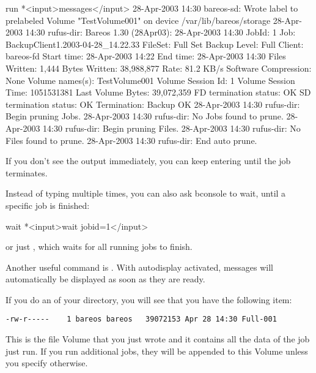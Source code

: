 
\begin{bconsole}{run}
*<input>messages</input>
28-Apr-2003 14:30 bareos-sd: Wrote label to prelabeled Volume
   "TestVolume001" on device /var/lib/bareos/storage
28-Apr-2003 14:30 rufus-dir: Bareos 1.30 (28Apr03): 28-Apr-2003 14:30
JobId:                  1
Job:                    BackupClient1.2003-04-28_14.22.33
FileSet:                Full Set
Backup Level:           Full
Client:                 bareos-fd
Start time:             28-Apr-2003 14:22
End time:               28-Apr-2003 14:30
Files Written:          1,444
Bytes Written:          38,988,877
Rate:                   81.2 KB/s
Software Compression:   None
Volume names(s):        TestVolume001
Volume Session Id:      1
Volume Session Time:    1051531381
Last Volume Bytes:      39,072,359
FD termination status:  OK
SD termination status:  OK
Termination:            Backup OK
28-Apr-2003 14:30 rufus-dir: Begin pruning Jobs.
28-Apr-2003 14:30 rufus-dir: No Jobs found to prune.
28-Apr-2003 14:30 rufus-dir: Begin pruning Files.
28-Apr-2003 14:30 rufus-dir: No Files found to prune.
28-Apr-2003 14:30 rufus-dir: End auto prune.
\end{bconsole}

If you don't see the output immediately, you can keep entering 
until the job terminates.

Instead of typing  multiple times,
you can also ask bconsole to wait, until a specific job is finished:

\begin{bconsole}{wait}
*<input>wait jobid=1</input>
\end{bconsole}
or just , which waits for all running jobs to finish.

Another useful command is .
With autodisplay activated, messages will automatically be displayed as soon as they are ready.

If you do an  of your  directory, you will see that you
have the following item:

\footnotesize
\begin{verbatim}
-rw-r-----    1 bareos bareos   39072153 Apr 28 14:30 Full-001
\end{verbatim}
\normalsize

This is the file Volume that you just wrote and it contains all the data of
the job just run. If you run additional jobs, they will be appended to this
Volume unless you specify otherwise.

